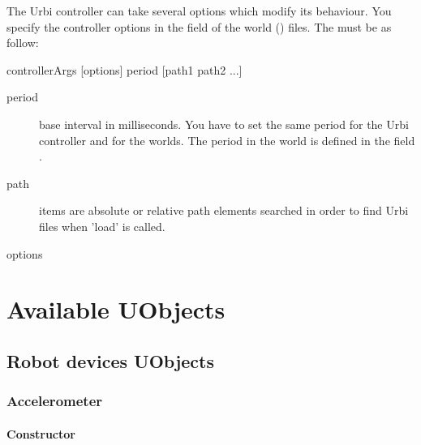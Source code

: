 The Urbi controller can take several options which modify its
behaviour.  You specify the controller options in the
 field of the \webots world () files.
The  must be as follow:

\begin{shell}
controllerArgs [options] period [path1 path2 ...]
\end{shell}

\begin{description}
\item[period] base \urbi interval in milliseconds. You have to set the
  same period for the Urbi controller and for the \webots worlds. The
  period in the \webots world is defined in the field
  .

\item[path] items are absolute or relative path elements searched in
  order to find Urbi files when 'load' is called.

\item[options]
\end{description}


\section{Available UObjects}

\subsection{Robot devices UObjects}

\subsubsection{Accelerometer}

\paragraph{Constructor}

